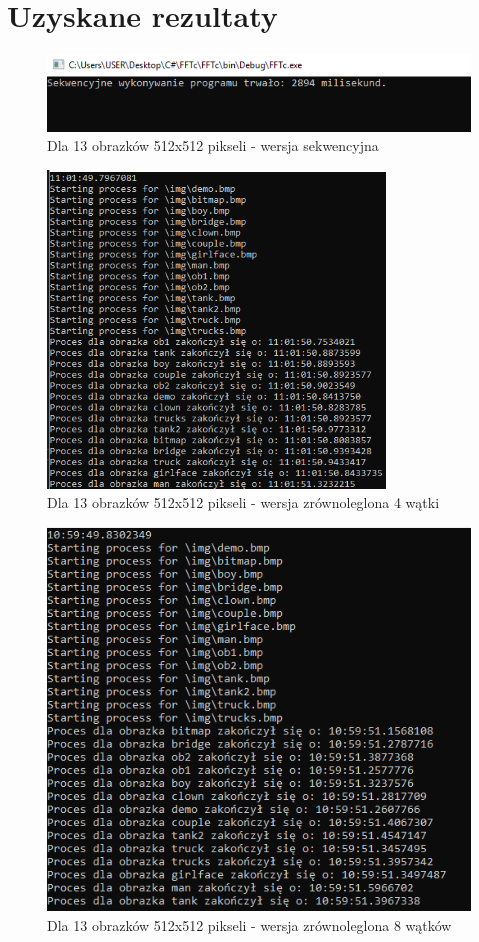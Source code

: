 \section{Uzyskane rezultaty}
\begin{figure}[ht]
	\includegraphics[width=\textwidth]{figures/Seq13.png}
	\centering
	\caption{Dla 13 obrazków 512x512 pikseli - wersja sekwencyjna}
\end{figure}
\begin{figure}[ht]
	\includegraphics[width=0.8\textwidth]{figures/Par13Wat4.png}
	\centering
	\caption{Dla 13 obrazków 512x512 pikseli - wersja zrównoleglona 4 wątki}
\end{figure}
\begin{figure}[ht]
	\includegraphics[width=\textwidth]{figures/Par13Wat8.png}
	\centering
	\caption{Dla 13 obrazków 512x512 pikseli - wersja zrównoleglona 8 wątków}
\end{figure}
